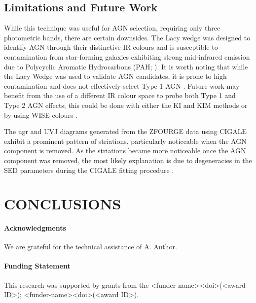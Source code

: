 \documentclass[
  journal=pasa,
  manuscript=research-paper,
  year=202X,
  volume=YY,
]{cup-journal}
\begin{document}
\subsection{Limitations and Future Work}
\label{subsec:disc_limitations}

While this technique was useful for AGN selection, requiring only three photometric bands, there are certain downsides. The Lacy wedge was designed to identify AGN through their distinctive IR colours and is susceptible to contamination from star-forming galaxies exhibiting strong mid-infrared emission due to Polycyclic Aromatic Hydrocarbons (PAH; \citealt{sajina_simulating_2005}). It is worth noting that while the Lacy Wedge was used to validate AGN candidates, it is prone to high contamination and does not effectively select Type 1 AGN \citep{donley_identifying_2012}. Future work may benefit from the use of a different IR colour space to probe both Type 1 and Type 2 AGN effects; this could be done with either the KI and KIM methods \citep{messias_new_2012, messias_dependency_2014} or by using WISE colours \citep{caccianiga_wise_2015}.

The ugr and UVJ diagrams generated from the ZFOURGE data using CIGALE exhibit a prominent pattern of striations, particularly noticeable when the AGN component is removed. As the striations became more noticeable once the AGN component was removed, the most likely explanation is due to degeneracies in the SED parameters during the CIGALE fitting procedure \citep{yang_x-cigale_2020}.

\section{CONCLUSIONS}
\label{sec:conclusions}

\newpage
\paragraph{Acknowledgments}
We are grateful for the technical assistance of A. Author.

\paragraph{Funding Statement}
This research was supported by grants from the <funder-name><doi>(<award ID>); <funder-name><doi>(<award ID>).
\end{document}
